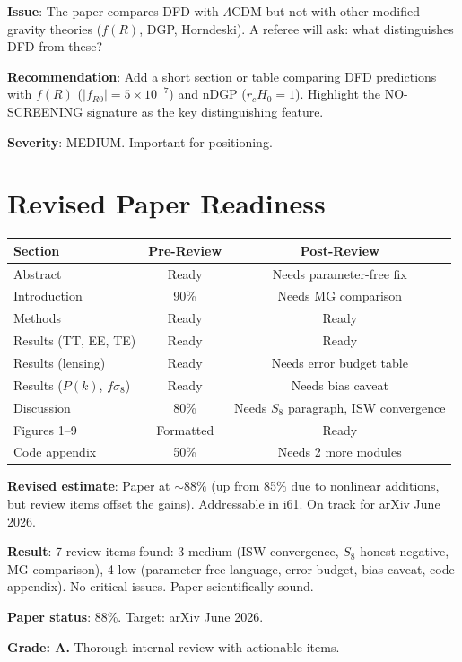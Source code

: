 \documentclass[11pt,a4paper]{article}
\begin{document}
\textbf{Issue}: The paper compares DFD with $\Lambda$CDM but not with other modified gravity theories ($f(R)$, DGP, Horndeski). A referee will ask: what distinguishes DFD from these?

\textbf{Recommendation}: Add a short section or table comparing DFD predictions with $f(R)$ ($|f_{R0}| = 5 \times 10^{-7}$) and nDGP ($r_c H_0 = 1$). Highlight the NO-SCREENING signature as the key distinguishing feature.

\textbf{Severity}: MEDIUM. Important for positioning.

\section{Revised Paper Readiness}

\begin{center}
\begin{tabular}{lcc}
\toprule
\textbf{Section} & \textbf{Pre-Review} & \textbf{Post-Review} \\
\midrule
Abstract & Ready & Needs parameter-free fix \\
Introduction & 90\% & Needs MG comparison \\
Methods & Ready & Ready \\
Results (TT, EE, TE) & Ready & Ready \\
Results (lensing) & Ready & Needs error budget table \\
Results ($P(k)$, $f\sigma_8$) & Ready & Needs bias caveat \\
Discussion & 80\% & Needs $S_8$ paragraph, ISW convergence \\
Figures 1--9 & Formatted & Ready \\
Code appendix & 50\% & Needs 2 more modules \\
\bottomrule
\end{tabular}
\end{center}

\textbf{Revised estimate}: Paper at $\sim 88\%$ (up from 85\% due to nonlinear additions, but review items offset the gains). Addressable in i61. On track for arXiv June 2026.

\begin{tcolorbox}[colback=green!5!white, colframe=green!60!black, title={Agent 13: $C_\ell$ Paper Internal Review --- 7 ITEMS IDENTIFIED}]
\textbf{Result}: 7 review items found: 3 medium (ISW convergence, $S_8$ honest negative, MG comparison), 4 low (parameter-free language, error budget, bias caveat, code appendix). No critical issues. Paper scientifically sound.

\textbf{Paper status}: 88\%. Target: arXiv June 2026.

\textbf{Grade: A.} Thorough internal review with actionable items.
\end{tcolorbox}
\end{document}
